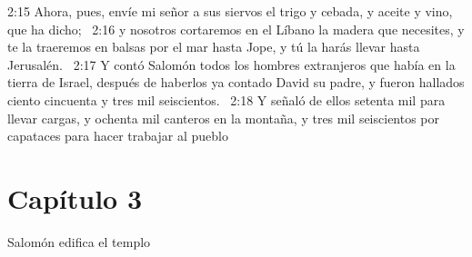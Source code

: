 		2:15 Ahora, pues, envíe mi señor a sus siervos el trigo y cebada, y aceite y vino, que ha dicho;  
		2:16 y nosotros cortaremos en el Líbano la madera que necesites, y te la traeremos en balsas por el mar hasta Jope, y tú la harás llevar hasta Jerusalén.  
		2:17 Y contó Salomón todos los hombres extranjeros que había en la tierra de Israel, después de haberlos ya contado David su padre, y fueron hallados ciento cincuenta y tres mil seiscientos.  
		2:18 Y señaló de ellos setenta mil para llevar cargas, y ochenta mil canteros en la montaña, y tres mil seiscientos por capataces para hacer trabajar al pueblo  
		\section*{Capítulo 3}
			Salomón edifica el templo   
			
